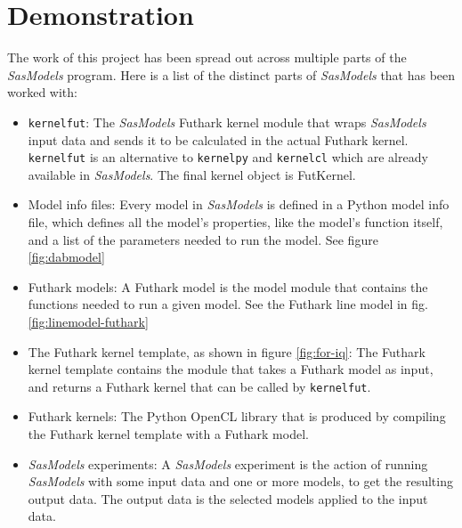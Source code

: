 \documentclass[11pt]{article}
\newcommand{\sasmodels}{\textit{SasModels}}
\begin{document}
\section{Demonstration}
\begin{mdframed}[frametitle={Terminology:}]
  The work of this project has been spread out across multiple parts
  of the \sasmodels{} program. Here is a list of the distinct parts of \sasmodels
  that has been worked with:
  \begin{itemize}
    \item \texttt{kernelfut}: The \sasmodels{} Futhark kernel module that wraps 
    \sasmodels{} input data and sends it to be calculated in the actual Futhark 
    kernel. \texttt{kernelfut} is an alternative to \texttt{kernelpy} and
    \texttt{kernelcl} which are already available in \sasmodels.
    The final kernel object is FutKernel.

    \item Model info files: Every model in \sasmodels{} is defined in a Python 
    model info file, which defines all the model's properties, like the model's
    function itself, and a list of the parameters needed to run the model.
    See figure \ref{fig:dabmodel}

    \item Futhark models: A Futhark model is the model module that contains the
    functions needed to run a given model. See the Futhark line model in fig. 
    \ref{fig:linemodel-futhark}
    
    \item The Futhark kernel template, as shown in figure \ref{fig:for-iq}:
    The Futhark kernel template contains the module that takes a Futhark
    model as input, and returns a Futhark kernel that can be called by 
    \texttt{kernelfut}.
    
    \item Futhark kernels: The Python OpenCL library that is produced by 
    compiling the Futhark kernel template with a Futhark model.

    \item \sasmodels{} experiments: A \sasmodels{} experiment is the action of 
    running \sasmodels{} with some input data and one or more models, to get 
    the resulting output data. The output data is the selected models applied
    to the input data.
  \end{itemize}
  
\end{mdframed}
\end{document}
